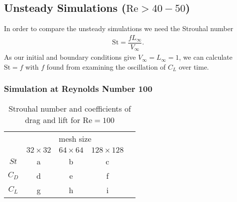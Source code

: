 	\subsection{Unsteady Simulations ($\text{Re}> 40-50$)}
	In order to compare the unsteady simulations we need the Strouhal number
	\begin{align}
		\text{St} = \dfrac{f  L_\infty}{V_\infty}.
	\end{align}
	As our initial and boundary conditions give $V_\infty = L_\infty = 1$, we can calculate $\text{St} = f$ with $f$ found from examining the oscillation of $C_L$ over time. 
	\subsubsection{Simulation at Reynolds Number 100}
			\begin{table}[htp]
				\centering
				\begin{tabular}{|c||c|c|c|c}
					\cline{1-4}
					\rule{0pt}{2,3ex}\multirow{2}{*}{}   & \multicolumn{3}{c|}{mesh size} &  \\ \cline{2-4}
					\rule{0pt}{2,3ex}& $32 \times 32$       & $64 \times 64$       & $128 \times 128$      &  \\ \cline{1-4}
					\rule{0pt}{2,3ex}$St$ 				 & a        & b        & c        &  \\ \cline{1-4}
					\rule{0pt}{2,3ex}$C_D$                & d        & e        & f        &  \\ \cline{1-4}
					\rule{0pt}{2,3ex}$C_L$                & g        & h        & i        &  \\ \cline{1-4}
				\end{tabular}
				\caption{Strouhal number and coefficients of drag and lift for $\text{Re}=100$}
				\label{tab:re100}
			\end{table}
			
